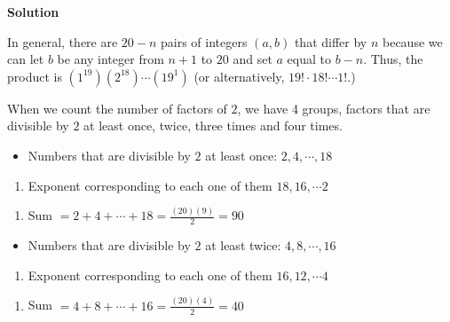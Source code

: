 \begin{enumerate}
\textbf{Solution}

In general, there are $20-n$ pairs of integers $(a, b)$ that differ by $n$ because we can let $b$ be any integer from $n+1$ to $20$ and set $a$ equal to $b-n$. Thus, the product is $(1^{19})(2^{18})\cdots(19^1)$ (or alternatively, $19! \cdot 18! \cdots 1!$.)

 When we count the number of factors of $2$, we have 4 groups, factors that are divisible by $2$ at least once, twice, three times and four times.

 


 
            \begin{itemize}
        \item Numbers that are divisible by $2$ at least once: $2, 4, \cdots, 18$
            \end{itemize}
            
            \begin{enumerate}[label=(\roman*)]
                \item Exponent corresponding to each one of them $18, 16, \cdots 2$
            \end{enumerate}
            
            \begin{enumerate}[label=(\roman*)]
                \item Sum $=2+4+\cdots+18=\frac{(20)(9)}{2}=90$
            \end{enumerate}
            


 
            \begin{itemize}
        \item Numbers that are divisible by $2$ at least twice: $4, 8, \cdots, 16$
            \end{itemize}
            
            \begin{enumerate}[label=(\roman*)]
                \item Exponent corresponding to each one of them $16, 12, \cdots 4$
            \end{enumerate}
            
            \begin{enumerate}[label=(\roman*)]
                \item Sum $=4+8+\cdots+16=\frac{(20)(4)}{2}=40$
            \end{enumerate}
            



\end{enumerate}
